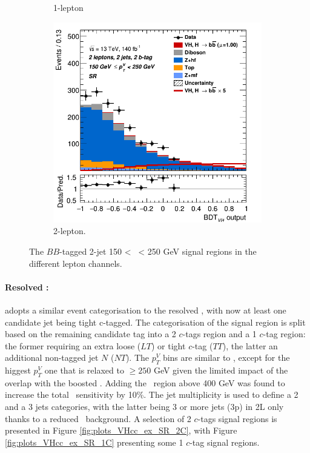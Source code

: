 \begin{figure}[h!]
\begin{subfigure}[b]{0.32\textwidth}
      \caption{1-lepton}
      \label{fig:plots_VHbb_ex_1L_SR}
  \end{subfigure}
  \begin{subfigure}[b]{0.32\textwidth}
    \centering
    \includegraphics[width=\textwidth]{Images/VH/Own_fit/prefit_VHbb/Region_distmva_BMax250_BMin150_DSR_J2_TTypebb_T2_L2_Y6051_Prefit.png}
    \caption{2-lepton.}
    \label{fig:plots_VHbb_ex_2L_SR}
\end{subfigure}
  \caption{The $BB$-tagged 2-jet 150 < \ptv\ < 250 GeV signal regions in the different lepton channels.}
  \label{fig:plots_VHbb_ex_SR}
\end{figure} 


\paragraph{Resolved \vhc:} adopts a similar event categorisation to the resolved \vhb, with now at least one candidate jet being tight c-tagged. The categorisation of the signal region is split based on the remaining candidate tag into a 2 $c$-tags region and a 1 $c$-tag region: the former requiring an extra loose ($LT$) or tight $c$-tag ($TT$), the latter an additional non-tagged jet $N$ ($NT$). The $p_T^V$ bins are similar to \vhb, except for the higgest $p_T^V$ one that is relaxed to $\geq 250$ GeV given the limited impact of the overlap with the boosted \vhb. Adding the \ptv\ region above 400 GeV was found to increase the total \vhc\ sensitivity by 10\%. The jet multiplicity is used to define a 2 and a 3 jets categories, with the latter being 3 or more jets (3p) in 2L only thanks to a reduced \ttb\ background. A selection of 2 $c$-tags signal regions is presented in Figure \ref{fig:plots_VHcc_ex_SR_2C}, with Figure \ref{fig:plots_VHcc_ex_SR_1C} presenting some 1 $c$-tag signal regions.

